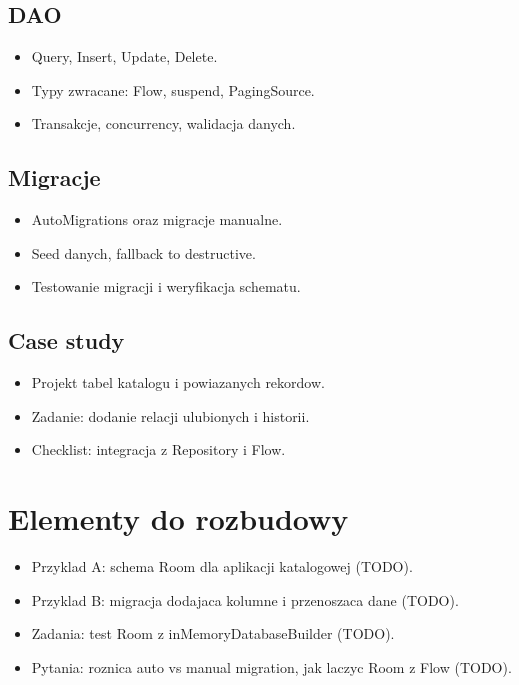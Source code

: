 \subsection{DAO}
\begin{itemize}
  \item Query, Insert, Update, Delete.
  \item Typy zwracane: Flow, suspend, PagingSource.
  \item Transakcje, concurrency, walidacja danych.
\end{itemize}

\subsection{Migracje}
\begin{itemize}
  \item AutoMigrations oraz migracje manualne.
  \item Seed danych, fallback to destructive.
  \item Testowanie migracji i weryfikacja schematu.
\end{itemize}

\subsection{Case study}
\begin{itemize}
  \item Projekt tabel katalogu i powiazanych rekordow.
  \item Zadanie: dodanie relacji ulubionych i historii.
  \item Checklist: integracja z Repository i Flow.
\end{itemize}

\section{Elementy do rozbudowy}
\begin{itemize}
  \item Przyklad A: schema Room dla aplikacji katalogowej (TODO).
  \item Przyklad B: migracja dodajaca kolumne i przenoszaca dane (TODO).
  \item Zadania: test Room z inMemoryDatabaseBuilder (TODO).
  \item Pytania: roznica auto vs manual migration, jak laczyc Room z Flow (TODO).
\end{itemize}

